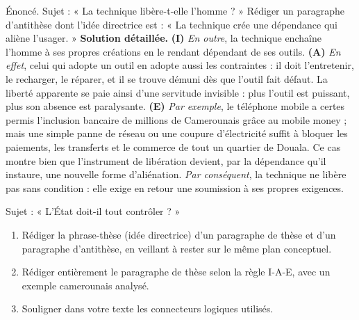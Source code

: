 \documentclass[11pt]{article}
\begin{document}
\begin{exoresolu}
Énoncé. Sujet : « La technique libère-t-elle l'homme ? » Rédiger un paragraphe d'antithèse dont l'idée directrice est : « La technique crée une dépendance qui aliène l'usager. »
\tcblower
\textbf{Solution détaillée.}
\textbf{(I)} \emph{En outre}, la technique enchaîne l'homme à ses propres créations en le rendant dépendant de ses outils. \textbf{(A)} \emph{En effet}, celui qui adopte un outil en adopte aussi les contraintes : il doit l'entretenir, le recharger, le réparer, et il se trouve démuni dès que l'outil fait défaut. La liberté apparente se paie ainsi d'une servitude invisible : plus l'outil est puissant, plus son absence est paralysante. \textbf{(E)} \emph{Par exemple}, le téléphone mobile a certes permis l'inclusion bancaire de millions de Camerounais grâce au mobile money ; mais une simple panne de réseau ou une coupure d'électricité suffit à bloquer les paiements, les transferts et le commerce de tout un quartier de Douala. Ce cas montre bien que l'instrument de libération devient, par la dépendance qu'il instaure, une nouvelle forme d'aliénation. \emph{Par conséquent}, la technique ne libère pas sans condition : elle exige en retour une soumission à ses propres exigences.
\end{exoresolu}

\begin{exercice}
Sujet : « L'État doit-il tout contrôler ? »
\begin{enumerate}
\item Rédiger la phrase-thèse (idée directrice) d'un paragraphe de thèse et d'un paragraphe d'antithèse, en veillant à rester sur le même plan conceptuel.
\item Rédiger entièrement le paragraphe de thèse selon la règle I-A-E, avec un exemple camerounais analysé.
\item Souligner dans votre texte les connecteurs logiques utilisés.
\end{enumerate}
\end{exercice}
\end{document}
